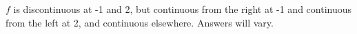 {$f$ is discontinuous at -1 and 2, but continuous from the right at -1 and continuous from the left at 2, and continuous elsewhere.}
{Answers will vary.}
